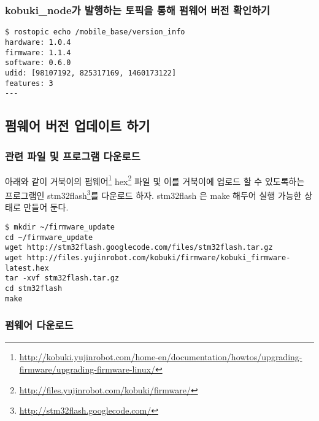 \subsubsection{kobuki\_node가 발행하는 토픽을 통해 펌웨어 버전 확인하기}

\vspace{\baselineskip}
\begin{lstlisting}[language=ROS]
$ rostopic echo /mobile_base/version_info 
hardware: 1.0.4
firmware: 1.1.4
software: 0.6.0
udid: [98107192, 825317169, 1460173122]
features: 3
---
\end{lstlisting}

\subsection{펌웨어 버전 업데이트 하기}

\subsubsection{관련 파일 및 프로그램 다운로드}

아래와 같이 거북이의 펌웨어\footnote{\url{http://kobuki.yujinrobot.com/home-en/documentation/howtos/upgrading-firmware/upgrading-firmware-linux/}} hex\footnote{\url{http://files.yujinrobot.com/kobuki/firmware/}} 파일 및 이를 거북이에 업로드 할 수 있도록하는 프로그램인 stm32flash\footnote{\url{http://stm32flash.googlecode.com/}}를 다운로드 하자. stm32flash 은 make 해두어 실행 가능한 상태로 만들어 둔다. 

\vspace{\baselineskip}
\begin{lstlisting}[language=ROS]
$ mkdir ~/firmware_update
cd ~/firmware_update
wget http://stm32flash.googlecode.com/files/stm32flash.tar.gz
wget http://files.yujinrobot.com/kobuki/firmware/kobuki_firmware-latest.hex
tar -xvf stm32flash.tar.gz
cd stm32flash
make
\end{lstlisting}


\subsubsection{펌웨어 다운로드}

